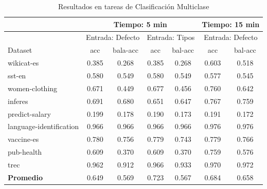 \begin{table}
  \centering
  \resizebox{15cm}{!} {
    \begin{tabular}{|l|cccccc|}
  \hline
          & \multicolumn{4}{p{8cm}|}{Tiempo: 5 min}  & \multicolumn{2}{p{4cm}|}{Tiempo: 15 min}\\  \hline
          & \multicolumn{2}{p{4cm}|}{Entrada: Defecto} & \multicolumn{2}{p{4cm}|}{Entrada: Tipos} & \multicolumn{2}{p{4cm}|}{Entrada: Defecto}\\ \hline
          Dataset & acc & bala-acc & acc  & bal-acc & acc & bal-acc  \\ \hline
  wikicat-es              & 0.385 & 0.268 & 0.385 & 0.268 & 0.603 & 0.518 \\
  sst-en                  & 0.580 & 0.549 & 0.580 & 0.549 & 0.577 & 0.545 \\
  women-clothing          & 0.671 & 0.449 & 0.677 & 0.456 & 0.760 & 0.642 \\ 
  inferes                 & 0.691 & 0.680 & 0.651 & 0.647 & 0.767 & 0.759 \\
  predict-salary          & 0.199 & 0.178 & 0.190 & 0.173 & 0.191 & 0.172 \\
  language-identification & 0.966 & 0.966 & 0.966 & 0.966 & 0.976 & 0.976 \\
  vaccine-es              & 0.780 & 0.756 & 0.779 & 0.743 & 0.779 & 0.766 \\
  pub-health              & 0.609 & 0.370 & 0.609 & 0.370 & 0.759 & 0.576 \\ 
  trec                    & 0.962 & 0.912 & 0.966 & 0.933 & 0.970 & 0.972 \\ \hline
  \textbf{Promedio}       & 0.649 & 0.569 & 0.723 & 0.567 & 0.684 & 0.658 \\ \hline


    \end{tabular}
  \caption{Resultados en tareas de Clasificación Multiclase}
  \label{fig:class-multi}
  }
\end{table}


